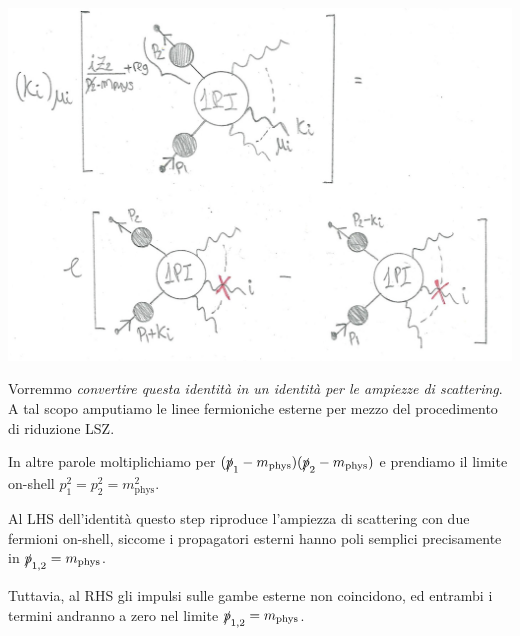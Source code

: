\documentclass[../main.tex]{subfiles}
\begin{document}
\includegraphics[width=\linewidth]{images_ch4/WT_ID_2elctr_Nphot.jpg}

Vorremmo \textit{convertire questa identità in un identità per le ampiezze di scattering}. A tal scopo amputiamo le linee fermioniche esterne per mezzo del procedimento di riduzione LSZ.

In altre parole moltiplichiamo per \( (\slashed p_1 - m_\text{phys})(\slashed p_2 - m_\text{phys}) \) e prendiamo il limite on-shell \(p_1^2=p_2^2=m^2_\text{phys}\).

Al LHS dell'identità questo step riproduce l'ampiezza di scattering con due fermioni on-shell, siccome i propagatori esterni hanno poli semplici precisamente in \(\slashed p_{1,2} = m_\text{phys}\).

Tuttavia, al RHS gli impulsi sulle gambe esterne non coincidono, ed entrambi i termini andranno a zero nel limite \(\slashed p_{1,2} = m_\text{phys}\).
\end{document}
